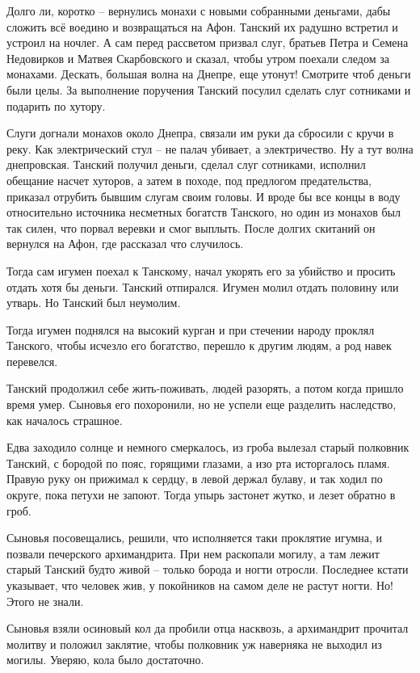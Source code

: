 \documentclass[a5paper,11pt,openany]{article}
\begin{document}
   Долго ли, коротко – вернулись монахи с новыми собранными деньгами, дабы сложить всё воедино и возвращаться на Афон. Танский их радушно встретил и устроил на ночлег. А сам перед рассветом призвал слуг, братьев Петра и Семена Недовирков и Матвея Скарбовского и сказал, чтобы утром поехали следом за монахами. Дескать, большая волна на Днепре, еще утонут! Смотрите чтоб деньги были целы. За выполнение поручения Танский посулил сделать слуг сотниками и подарить по хутору.

   Слуги догнали монахов около Днепра, связали им руки да сбросили с кручи в реку. Как электрический стул – не палач убивает, а электричество. Ну а тут волна днепровская. Танский получил деньги, сделал слуг сотниками, исполнил обещание насчет хуторов, а затем в походе, под предлогом предательства, приказал отрубить бывшим слугам своим головы. И вроде бы все концы в воду относительно источника несметных богатств Танского, но один из монахов был так силен, что порвал веревки и смог выплыть. После долгих скитаний он вернулся на Афон, где рассказал что случилось.

    Тогда сам игумен поехал к Танскому, начал укорять его за убийство и просить отдать хотя бы деньги. Танский отпирался. Игумен молил отдать половину или утварь. Но Танский был неумолим.

   Тогда игумен поднялся на высокий курган и при стечении народу проклял Танского, чтобы исчезло его богатство, перешло к другим людям, а род навек перевелся.

   Танский продолжил себе жить-поживать, людей разорять, а потом когда пришло время умер. Сыновья его похоронили, но не успели еще разделить наследство, как началось страшное. 

   Едва заходило солнце и немного смеркалось, из гроба вылезал старый полковник Танский, с бородой по пояс, горящими глазами, а изо рта исторгалось пламя. Правую руку он прижимал к сердцу, в левой держал булаву, и так ходил по округе, пока петухи не запоют. Тогда упырь застонет жутко, и лезет обратно в гроб. 

   Сыновья посовещались, решили, что исполняется таки проклятие игумна, и позвали печерского архимандрита. При нем раскопали могилу, а там лежит старый Танский будто живой – только борода и ногти отросли. Последнее кстати указывает, что человек жив, у покойников на самом деле не растут ногти. Но! Этого не знали.

   Сыновья взяли осиновый кол да пробили отца насквозь, а архимандрит прочитал молитву и положил заклятие, чтобы полковник уж наверняка не выходил из могилы. Уверяю, кола было достаточно.
\end{document}
